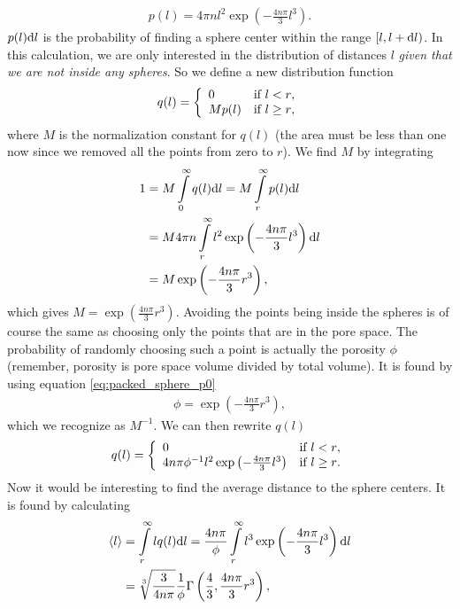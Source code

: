 \begin{align}
	\label{eq:packed_sphere_probability_number_density}
	p(l) = 4\pi n l^2 \exp\left(-\frac{4n\pi}{3}l^3\right).
\end{align}
$p(l)\mathrm{d}l$ is the probability of finding a sphere center within the range $[l, l+\mathrm{d}l)$. In this calculation, we are only interested in the distribution of distances $l$ \textit{given that we are not inside any spheres}. So we define a new distribution function
\begin{align}
	q(l) = \left\{\begin{array}{l l}
			0 & \text{if $l<r$},\\
			Mp(l) & \text{if $l\geq r$},
			\end{array}\right.
\end{align}
where $M$ is the normalization constant for $q(l)$ (the area must be less than one now since we removed all the points from zero to $r$). We find $M$ by integrating
\begin{align}
	1 &= M\int\limits_0^\infty q(l)\mathrm{d}l = M\int\limits_r^\infty p(l)\mathrm{d}l\\
	&= M4\pi n\int\limits_r^\infty l^2 \exp\left(-\frac{4n\pi}{3}l^3\right) \mathrm{d}l\\
	&= M\exp\left(-\frac{4n\pi}{3}r^3\right),
\end{align}
which gives $M=\exp\left(\frac{4n\pi}{3}r^3\right)$. Avoiding the points being inside the spheres is of course the same as choosing only the points that are in the pore space. The probability of randomly choosing such a point is actually the porosity $\phi$ (remember, porosity is pore space volume divided by total volume). It is found by using equation \eqref{eq:packed_sphere_p0}
\begin{align}
	\label{eq:packed_sphere_porosity}
	\phi = \exp\left(-\frac{4n\pi}{3}r^3\right),
\end{align}
which we recognize as $M^{-1}$. We can then rewrite $q(l)$
\begin{align}
	q(l) = \left\{\begin{array}{l l}
			0 & \text{if $l<r$},\\
			4n\pi\phi^{-1} l^2 \exp\left(-\frac{4n\pi}{3}l^3\right) & \text{if $l\geq r$}.
			\end{array}\right.
\end{align}
Now it would be interesting to find the average distance to the sphere centers. It is found by calculating
\begin{align}
	\langle l\rangle &= \int\limits_r^\infty lq(l) \mathrm{d}l = \frac{4n\pi}{\phi}\int\limits_r^\infty l^3 \exp\left(-\frac{4n\pi}{3}l^3\right) \mathrm{d}l \\
	\label{eq:packed_sphere_average_distance}
	&= \sqrt[3]{\frac{3}{4n\pi}}\frac{1}{\phi}\Gamma\left(\frac{4}{3}, \frac{4n\pi}{3}r^3\right),
\end{align}
